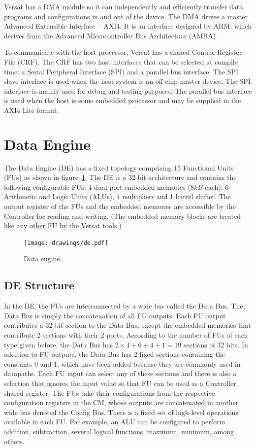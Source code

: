 Versat has a DMA module so it can independently and efficiently
transfer data, programs and configurations in and out of the
device. The DMA drives a master Advanced Extensible Interface --
AXI4. It is an interface designed by ARM, which derives from the
Advanced Microcontroller Bus Architecture (AMBA).

To communicate with the host processor, Versat has a shared Control
Register File (CRF). The CRF has two host interfaces that can be
selected at compile time: a Serial Peripheral Interface (SPI) and a
parallel bus interface. The SPI slave interface is used when the host
system is an off-chip master device. The SPI interface is mainly used
for debug and testing purposes. The parallel bus interface is used
when the host is some embedded processor and may be supplied in the
AXI4 Lite format.


\section{Data Engine}
\label{section:dataEngine}

The Data Engine (DE) has a fixed topology comprising 15 Functional
Units (FUs) as shown in figure~\ref{fig_de}. The DE is a 32-bit
architecture and contains the following configurable FUs: 4 dual-port
embedded memories ($8kB$ each), 6 Arithmetic and Logic Units (ALUs), 4
multipliers and 1 barrel shifter. The output register of the FUs and
the embedded memories are accessible by the Controller for reading and
writing. (The embedded memory blocks are treated like any other FU by
the Versat tools.)

\begin{figure}[!htb]
\centering
\texttt{[image: drawings/de.pdf]}
\caption{Data engine.}
\label{fig_de}
\end{figure}

\subsection{DE Structure}
\label{subsection:DEStructure}

In the DE, the FUs are interconnected by a wide bus called the Data
Bus. The Data Bus is simply the concatenation of all FU outputs. Each
FU output contributes a 32-bit section to the Data Bus, except the
embedded memories that contribute 2 sections with their 2
ports. According to the number of FUs of each type given before, the
Data Bus has $2\times4+6+4+1=19$ sections of 32 bits. In addition to
FU outputs, the Data Bus has 2 fixed sections containing the constants
0 and 1, which have been added because they are commonly used in
datapaths. Each FU input can select any of these sections and there is
also a selection that ignores the input value so that FU can be used
as a Controller shared register. The FUs take their configurations
from the respective configuration registers in the CM, whose outputs
are concatenated in another wide bus denoted the Config Bus. There is
a fixed set of high-level operations available in each FU. For
example, an ALU can be configured to perform addition, subtraction,
several logical functions, maximum, minimum, among others.

